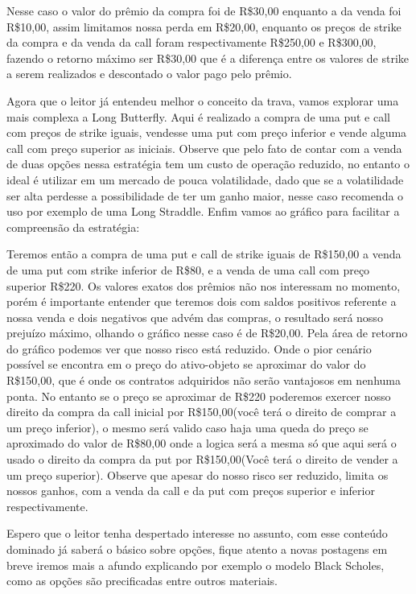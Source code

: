 \documentclass[]{book}
\begin{document}
Nesse caso o valor do prêmio da compra foi de R\$30,00 enquanto a da
venda foi R\$10,00, assim limitamos nossa perda em R\$20,00, enquanto os
preços de strike da compra e da venda da call foram respectivamente
R\$250,00 e R\$300,00, fazendo o retorno máximo ser R\$30,00 que é a
diferença entre os valores de strike a serem realizados e descontado o
valor pago pelo prêmio.

Agora que o leitor já entendeu melhor o conceito da trava, vamos
explorar uma mais complexa a Long Butterfly. Aqui é realizado a compra
de uma put e call com preços de strike iguais, vendesse uma put com
preço inferior e vende alguma call com preço superior as iniciais.
Observe que pelo fato de contar com a venda de duas opções nessa
estratégia tem um custo de operação reduzido, no entanto o ideal é
utilizar em um mercado de pouca volatilidade, dado que se a volatilidade
ser alta perdesse a possibilidade de ter um ganho maior, nesse caso
recomenda o uso por exemplo de uma Long Straddle. Enfim vamos ao gráfico
para facilitar a compreensão da estratégia:

Teremos então a compra de uma put e call de strike iguais de R\$150,00 a
venda de uma put com strike inferior de R\$80, e a venda de uma call com
preço superior R\$220. Os valores exatos dos prêmios não nos interessam
no momento, porém é importante entender que teremos dois com saldos
positivos referente a nossa venda e dois negativos que advém das
compras, o resultado será nosso prejuízo máximo, olhando o gráfico nesse
caso é de R\$20,00. Pela área de retorno do gráfico podemos ver que
nosso risco está reduzido. Onde o pior cenário possível se encontra em o
preço do ativo-objeto se aproximar do valor do R\$150,00, que é onde os
contratos adquiridos não serão vantajosos em nenhuma ponta. No entanto
se o preço se aproximar de R\$220 poderemos exercer nosso direito da
compra da call inicial por R\$150,00(você terá o direito de comprar a um
preço inferior), o mesmo será valido caso haja uma queda do preço se
aproximado do valor de R\$80,00 onde a logica será a mesma só que aqui
será o usado o direito da compra da put por R\$150,00(Você terá o
direito de vender a um preço superior). Observe que apesar do nosso
risco ser reduzido, limita os nossos ganhos, com a venda da call e da
put com preços superior e inferior respectivamente.

Espero que o leitor tenha despertado interesse no assunto, com esse
conteúdo dominado já saberá o básico sobre opções, fique atento a novas
postagens em breve iremos mais a afundo explicando por exemplo o modelo
Black Scholes, como as opções são precificadas entre outros materiais.
\end{document}
